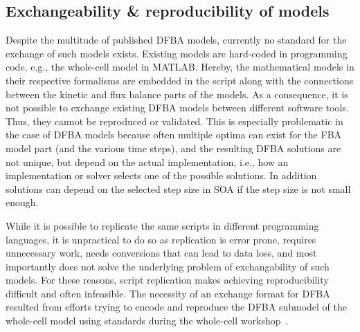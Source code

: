 \documentclass{bioinfo}
\begin{document}
\subsection{Exchangeability \& reproducibility of models}

Despite the multitude of published DFBA models, currently no standard for the exchange of such models exists. Existing models are hard-coded in programming code, e.g., the whole-cell model in MATLAB. Hereby, the mathematical models in their respective formalisms are embedded in the script along with the connections between the kinetic and flux balance parts of the models. As a consequence, it is not possible to exchange existing DFBA models between different software tools. Thus, they cannot be reproduced or validated. This is especially problematic in the case of DFBA models because often multiple optima can exist for the FBA model part (and the various time steps), and the resulting DFBA solutions are not unique, but depend on the actual implementation, i.e., how an implementation or solver selects one of the possible solutions. In addition solutions can depend on the selected step size in SOA if the step size is not small enough.

While it is possible to replicate the same scripts in different programming languages, it is unpractical to do so as replication is error prone, requires unnecessary work, needs conversions that can lead to data loss, and most importantly does not solve the underlying problem of exchangability of such models. For these reasons, script replication makes achieving reproducibility difficult and often infeasible. 
The necessity of an exchange format for DFBA resulted from efforts trying to encode and reproduce the DFBA submodel of the whole-cell model using standards during the whole-cell workshop~\citep{whole_cell_workshop}.
\end{document}
